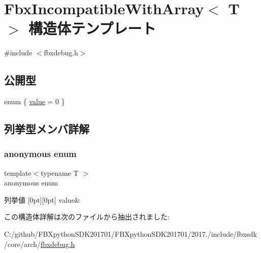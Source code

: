 \hypertarget{struct_fbx_incompatible_with_array}{}\section{Fbx\+Incompatible\+With\+Array$<$ T $>$ 構造体テンプレート}
\label{struct_fbx_incompatible_with_array}


{\ttfamily \#include $<$fbxdebug.\+h$>$}

\subsection*{公開型}
\begin{DoxyCompactItemize}
\item 
enum \{ \hyperlink{struct_fbx_incompatible_with_array_a743e133c2fd464a89727c246358c5a58a9cca835a5c42f16108589087ba958114}{value} = 0
 \}
\end{DoxyCompactItemize}


\subsection{列挙型メンバ詳解}
\mbox{\label{struct_fbx_incompatible_with_array_a743e133c2fd464a89727c246358c5a58}} 
\subsubsection{\texorpdfstring{anonymous enum}{anonymous enum}}
{\footnotesize\ttfamily template$<$typename T $>$ \\
anonymous enum}

\begin{DoxyEnumFields}{列挙値}
[0pt][0pt]{}\mbox{\label{struct_fbx_incompatible_with_array_a743e133c2fd464a89727c246358c5a58a9cca835a5c42f16108589087ba958114}} 
value&\\
\hline

\end{DoxyEnumFields}


この構造体詳解は次のファイルから抽出されました\+:\begin{DoxyCompactItemize}
\item 
C\+:/github/\+F\+B\+Xpython\+S\+D\+K201701/\+F\+B\+Xpython\+S\+D\+K201701/2017./include/fbxsdk/core/arch/\hyperlink{fbxdebug_8h}{fbxdebug.\+h}\end{DoxyCompactItemize}
